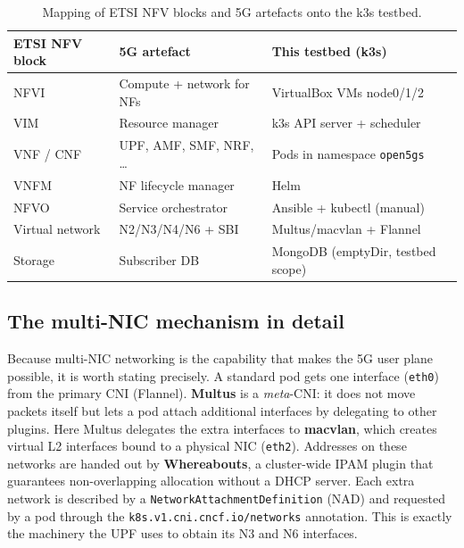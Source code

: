 \begin{table}[H]
\centering
\begin{tabular}{lll}
\toprule
\textbf{ETSI NFV block} & \textbf{5G artefact} & \textbf{This testbed (k3s)} \\
\midrule
NFVI            & Compute + network for NFs   & VirtualBox VMs node0/1/2 \\
VIM             & Resource manager            & k3s API server + scheduler \\
VNF / CNF       & UPF, AMF, SMF, NRF, \ldots   & Pods in namespace \texttt{open5gs} \\
VNFM            & NF lifecycle manager        & Helm \\
NFVO            & Service orchestrator        & Ansible + kubectl (manual) \\
Virtual network & N2/N3/N4/N6 + SBI           & Multus/macvlan + Flannel \\
Storage         & Subscriber DB               & MongoDB (emptyDir, testbed scope) \\
\bottomrule
\end{tabular}
\caption{Mapping of ETSI NFV blocks and 5G artefacts onto the k3s testbed.}
\label{tab:mapping}
\end{table}

\subsection{The multi-NIC mechanism in detail}

Because multi-NIC networking is the capability that makes the 5G user plane
possible, it is worth stating precisely. A standard pod gets one interface
(\texttt{eth0}) from the primary CNI (Flannel). \textbf{Multus} is a
\emph{meta}-CNI: it does not move packets itself but lets a pod attach
additional interfaces by delegating to other plugins. Here Multus delegates the
extra interfaces to \textbf{macvlan}, which creates virtual L2 interfaces bound
to a physical NIC (\texttt{eth2}). Addresses on these networks are handed out by
\textbf{Whereabouts}, a cluster-wide IPAM plugin that guarantees
non-overlapping allocation without a DHCP server. Each extra network is
described by a \texttt{NetworkAttachmentDefinition} (NAD) and requested by a pod
through the \texttt{k8s.v1.cni.cncf.io/networks} annotation. This is exactly the
machinery the UPF uses to obtain its N3 and N6 interfaces.
